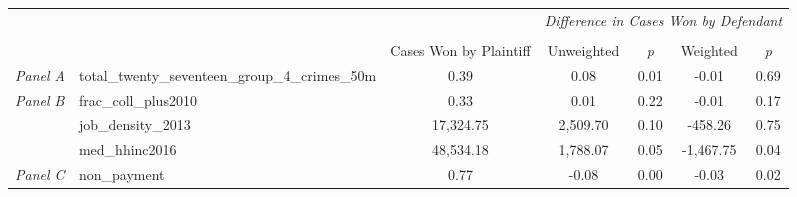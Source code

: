 \begin{tabular}{llccccc}
\toprule
 &  & \textit{} & \multicolumn{4}{c}{\textit{Difference in Cases Won by Defendant}} \\
\cline{4-7}
\\
 &  & Cases Won by Plaintiff & Unweighted & \emph{p} & Weighted & \emph{p} \\
\midrule
\textit{Panel A} & total_twenty_seventeen_group_4_crimes_50m & 0.39 & 0.08 & 0.01 & -0.01 & 0.69 \\
\cline{1-7}
\multirow[c]{3}{3cm}{\textit{Panel B}} & frac_coll_plus2010 & 0.33 & 0.01 & 0.22 & -0.01 & 0.17 \\
 & job_density_2013 & 17,324.75 & 2,509.70 & 0.10 & -458.26 & 0.75 \\
 & med_hhinc2016 & 48,534.18 & 1,788.07 & 0.05 & -1,467.75 & 0.04 \\
\cline{1-7}
\textit{Panel C} & non_payment & 0.77 & -0.08 & 0.00 & -0.03 & 0.02 \\
\cline{1-7}
\bottomrule
\end{tabular}
